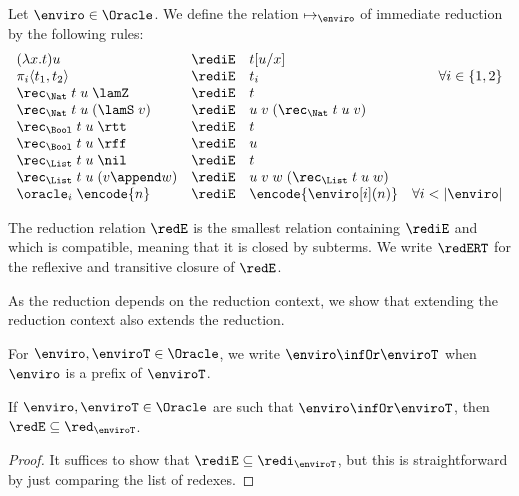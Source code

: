 \begin{definition}[Reduction]
  Let $\enviro \in \Oracle$.
  We define the relation $\mapsto_\enviro$ of immediate reduction by the following rules:
  \[\begin{array}{lclr}
    (\lambda x.t)u & \rediE & t[u/x] \\
    \pi_i \langle t_1,t_2\rangle & \rediE & t_i & \forall i \in \{1,2\} \\
    \rec_{\Nat}\;t\;u\;\lamZ & \rediE & t \\
    \rec_{\Nat}\;t\;u\;(\lamS\;v) & \rediE & u\;v\;(\rec_{\Nat}\;t\;u\;v) \\
    \rec_{\Bool}\;t\;u\;\rtt & \rediE & t \\
    \rec_{\Bool}\;t\;u\;\rff & \rediE &u \\
    \rec_{\List}\;t\;u\;\nil & \rediE &t \\
    \rec_{\List}\;t\;u\;(v \append w) & \rediE &u\;v\;w\;(\rec_{\List}\;t\;u\;w) \\
    \oracle_i\;\encode{n} & \rediE & \encode{\enviro[i](n)} & \forall i < |\enviro|
  \end{array}\]

  The reduction relation $\redE$ is the smallest relation containing $\rediE$ and which is compatible, meaning that it is closed by subterms. We write $\redERT$ for the reflexive and transitive closure of $\redE$.
\end{definition}


As the reduction depends on the reduction context, we show that extending the reduction context also extends the reduction.

\begin{notation}
  For $\enviro,\enviroT \in \Oracle$, we write $\enviro \infOr \enviroT$ when $\enviro$ is a prefix of $\enviroT$.

\end{notation}

\begin{proposition}
  If $\enviro, \enviroT \in \Oracle$ are such that $\enviro \infOr \enviroT$, then $\redE \subseteq \red_{\enviroT}$.
\end{proposition}

\begin{proof}
  It suffices to show that $\rediE\subseteq \redi_{\enviroT}$, but this is straightforward by just comparing the list of redexes.
\end{proof}

